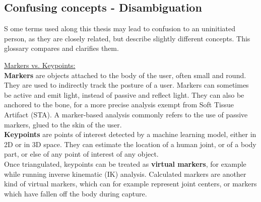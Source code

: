 
{} \mtcaddchapter
\label{Ann:gloss}

\vspace*{-1.6cm}
\begin{flushright}
\section*{\fontsize{20pt}{20pt}\selectfont\textnormal{Confusing concepts - Disambiguation}}
\end{flushright}
\vspace{-0.2cm}


\chead[\fancyplain{}{}]
      {\fancyplain{}{}}
\lfoot[\fancyplain{}{}]
      {\fancyplain{}{}}
\cfoot[\fancyplain{}{\thepage}]
      {\fancyplain{}{\thepage}}
\rfoot[\fancyplain{}{}]%
     {\fancyplain{}{\scriptsize}}


\lettrine[lines=1]{S}{ }ome terms used along this thesis may lead to confusion to an uninitiated person, as they are closely related, but describe slightly different concepts. This glossary compares and clarifies them.

\vspace*{1cm}

\noindent\underline{Markers vs. Keypoints:}\\
\textbf{Markers} are objects attached to the body of the user, often small and round. They are used to indirectly track the posture of a user. Markers can sometimes be active and emit light, instead of passive and reflect light. They can also be anchored to the bone, for a more precise analysis exempt from Soft Tissue Artifact (STA). A marker-based analysis commonly refers to the use of passive markers, glued to the skin of the user.\\
\textbf{Keypoints} are points of interest detected by a machine learning model, either in 2D or in 3D space. They can estimate the location of a human joint, or of a body part, or else of any point of interest of any object.\\
Once triangulated, keypoints can be treated as \textbf{virtual markers}, for example while running inverse kinematic (IK) analysis. Calculated markers are another kind of virtual markers, which can for example represent joint centers, or markers which have fallen off the body during capture.

